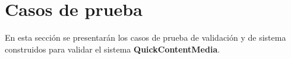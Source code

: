 \section{Casos de prueba}
En esta sección se presentarán los casos de prueba de validación y de sistema construidos para validar el sistema \textbf{QuickContentMedia}.


%